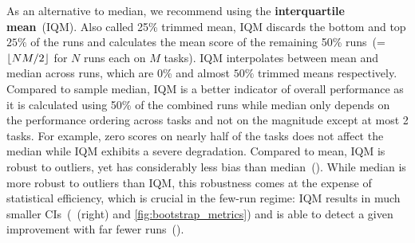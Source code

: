 As an alternative to median, we recommend using the \textbf{interquartile mean}~(IQM). Also called 25\% trimmed mean, IQM discards the bottom and top $25\%$ of the runs and calculates the mean score of the remaining 50\% runs~(=$\lfloor NM/2 \rfloor$ for $N$ runs each on $M$ tasks). IQM interpolates between mean and median across runs, which are 0\% and almost $50\%$ trimmed means respectively. Compared to sample median, IQM is a better indicator of overall performance as it is calculated using 50\% of the combined runs while 
median only depends on the performance ordering across tasks and not on the magnitude except at most 2 tasks. For example, zero scores on nearly half of the tasks does not affect the median while IQM exhibits a severe degradation. Compared to mean, IQM is robust to outliers, yet has considerably less bias than median~(). While median is more robust to outliers than IQM, this robustness comes at the expense of statistical efficiency, which is crucial in the few-run regime: IQM results in much smaller CIs~(~(right) and \ref{fig:bootstrap_metrics}) and is able to detect a given improvement with far fewer runs~().



